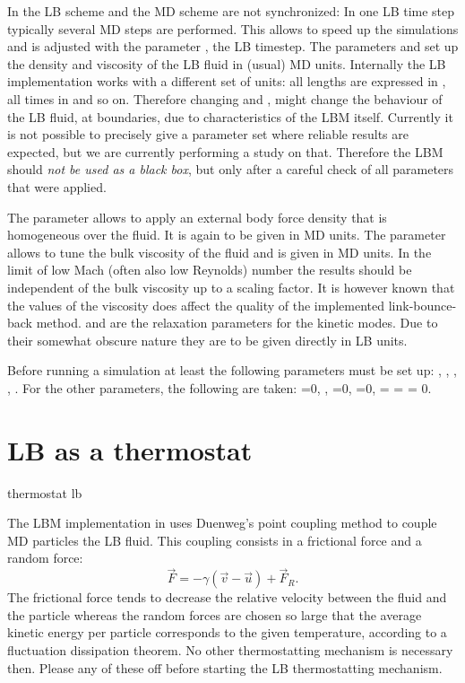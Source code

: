 In \es the LB scheme and the MD scheme are not synchronized: In one LB
time step typically several MD steps are performed. This allows to
speed up the simulations and is adjusted with the parameter ,
the LB timestep.
The parameters  and  set up the density and
viscosity of the LB fluid in (usual) MD units.  Internally the LB
implementation works with a different set of units: all lengths are
expressed in , all times in  and so on.  Therefore
changing  and , might change the behaviour of the
LB fluid, \eg at boundaries, due to characteristics of the LBM
itself. Currently it is not possible to precisely give a parameter set
where reliable results are expected, but we are currently performing a
study on that. Therefore the LBM should \emph{not be used as a black
  box}, but only after a careful check of all parameters that were
applied. 

The parameter  allows to apply an external body force
density that is homogeneous over the fluid. It is again to be given in
MD units.  The parameter  allows to tune the bulk
viscosity of the fluid and is given in MD units. In the limit of low
Mach (often also low Reynolds) number the results should be
independent of the bulk viscosity up to a scaling factor. 
It is however known that the values of the viscosity does 
affect the quality of the implemented link-bounce-back method.
 and
 are the relaxation parameters for the kinetic
modes. Due to their somewhat obscure nature they are to be given
directly in LB units.

Before running a simulation at least the following parameters must be
set up: , , , ,
. For the other parameters, the following are taken:
=0, , =0, =0,
 =  =  = 0.

\section{LB as a thermostat}
\begin{essyntax}
  thermostat lb  
  \begin{features}
  \end{features}
\end{essyntax}
The LBM implementation in \es uses Duenweg's point coupling method
to couple MD particles the LB fluid. This coupling consists
in a frictional force and a random force:
\begin{equation*}
  \vec{F} = -\gamma \left(\vec{v}-\vec{u}\right) + \vec{F}_R.
\end{equation*}
The frictional force tends to decrease the relative velocity
between the fluid and the particle whereas the random forces are chosen
so large that the average kinetic energy per particle corresponds to
the given temperature, according to a fluctuation dissipation theorem.
No other thermostatting mechanism is necessary then. Please any of these
off before starting the LB thermostatting mechanism.

